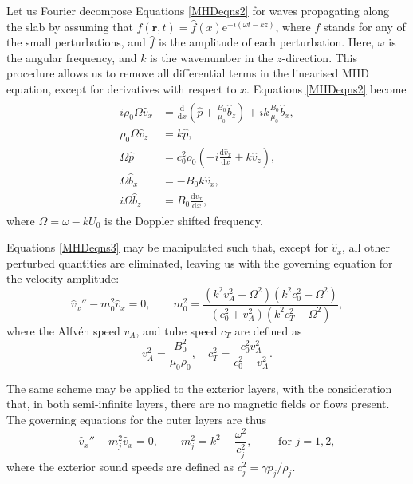 Let us Fourier decompose Equations \eqref{MHDeqns2} for waves propagating along the slab by assuming that $f(\mathbf{r}, t) = \hat{f}(x) \mathrm{e}^{-i (\omega t - k z)}$, where $f$ stands for any of the small perturbations, and $\hat{f}$ is the amplitude of each perturbation.
Here, $\omega$ is the angular frequency, and $k$ is the wavenumber in the $z$-direction.
This procedure allows us to remove all differential terms in the linearised MHD equation, except for derivatives with respect to $x$.
Equations \eqref{MHDeqns2} become
\begin{align}
\begin{split}
\label{MHDeqns3}
i \rho_0 \Omega \hat v_x
& = \frac{\mathrm{d}}{\mathrm{d} x} \left (\hat p + \frac{B_0}{\mu_0} \hat b_z \right )
+ ik \frac{B_0}{\mu_0} \hat b_x,
\\
\rho_0 \Omega \hat v_z
& = k \hat p,
\\
\Omega \hat p
& = c_0^2 \rho_0 (- i \frac{\mathrm{d} \hat v_x}{\mathrm{d} x} + k \hat v_z),
\\
\Omega \hat b_x
& = - B_0 k \hat v_x,
\\
i \Omega \hat b_z
& = B_0 \frac{\mathrm{d} \hat v_x}{\mathrm{d} x},
\end{split}
\end{align}
where $\Omega = \omega - k U_0$ is the Doppler shifted frequency.

Equations \eqref{MHDeqns3} may be manipulated such that, except for $\hat{v}_x$, all other perturbed quantities are eliminated, leaving us with the governing equation for the velocity amplitude:
\begin{equation}
\label{eq1}
\hat{v}_x'' - m_0^2 \hat{v}_x = 0, \qquad m_0^2 = \frac{ ( k^2 v_A^2 - \Omega^2 ) ( k^2 c_0^2 - \Omega^2) }{ ( c_0^2 + v_A^2 ) ( k^2 c_T^2 - \Omega^2 )},
\end{equation}
where the Alfv\'en speed $v_A$, and tube speed $c_T$ are defined as
\[ v_A^2 = \frac{B_0^2}{\mu_0 \rho_0}, \quad c_T^2 = \frac{c_0^2 v_A^2}{c_0^2 + v_A^2}.\]

The same scheme may be applied to the exterior layers, with the consideration that, in both semi-infinite layers, there are no magnetic fields or flows present. The governing equations for the outer layers are thus
\begin{equation}
\label{eq2.2}
\hat{v}_x'' - m_j^2 \hat{v}_x = 0, \qquad m_j^2 = k^2 - \frac{\omega^2}{c_j^2}, \qquad \text{ for } j = 1, 2,
\end{equation}
where the exterior sound speeds are defined as $c_j^2 = \gamma p_j/\rho_j$.

